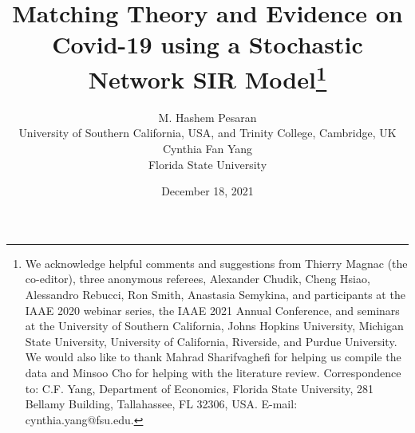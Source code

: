 \documentclass[12pt]{article}
\begin{document}
\title{Matching Theory and Evidence on Covid-19 using a Stochastic Network SIR
Model\thanks{We acknowledge helpful comments and suggestions from Thierry
Magnac (the co-editor), three anonymous referees, Alexander Chudik, Cheng
Hsiao, Alessandro Rebucci, Ron Smith, Anastasia Semykina, and participants at
the IAAE 2020 webinar series, the IAAE 2021 Annual Conference, and seminars at
the University of Southern California, Johns Hopkins University, Michigan
State University, University of California, Riverside, and Purdue University.
We would also like to thank Mahrad Sharifvaghefi for helping us compile the
data and Minsoo Cho for helping with the literature review. Correspondence to:
C.F. Yang, Department of Economics, Florida State University, 281 Bellamy
Building, Tallahassee, FL 32306, USA. E-mail: cynthia.yang@fsu.edu.}%
\textbf{{\Large {}}}}
\author{M. Hashem Pesaran\\{\small {}{}University of Southern California, USA, and Trinity College,
Cambridge, UK}\\Cynthia Fan Yang\\{\small {}{}{}{}Florida State University}%
\vspace*{-0.2cm}%
}
\date{December 18, 2021}
\maketitle
\end{document}

